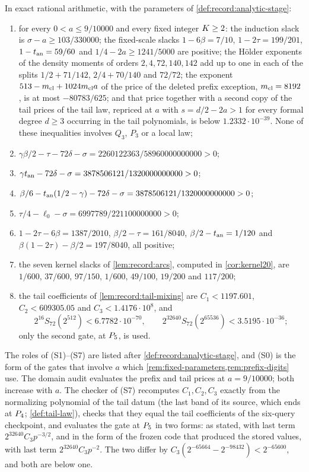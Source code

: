 \begin{certificate}\label{cert:record:analytic-stage}
In exact rational arithmetic, with the parameters of
\cref{def:record:analytic-stage}:
\begin{enumerate}[label=(S\arabic*),start=0]
\item for every $0<a\le9/10000$ and every fixed integer $K\ge2$: the
 induction slack is $\sigma-a\ge103/330000$; the fixed-scale slacks
 $1-6\beta=7/10$, $1-2\tau=199/201$, $1-t_{\rm an}=59/60$ and
 $1/4-2a\ge1241/5000$ are positive; the H\"older exponents of the density
 moments of orders $2,4,72,140,142$ add up to one in each of the splits
 $1/2+71/142$, $2/4+70/140$ and $72/72$; the exponent $513-m_{\mathrm{cl}}+1024m_{\mathrm{cl}} a$ of the
 price of the deleted prefix exception, $m_{\mathrm{cl}}=8192$, is at most $-80783/625$;
 and that price together with a second copy of the tail prices
 of the tail law, repriced at $a$ with $s=d/2-2a>1$ for every
 formal degree $d\ge3$ occurring in the tail polynomials, is
 below $1.2332\cdot10^{-39}$.
 None of these inequalities involves $Q_3$, $P_3$ or a local law;
\item $\gamma\beta/2-\tau-72\delta-\sigma=2260122363/58960000000000>0$;
\item $\gamma t_{\rm an}-72\delta-\sigma=3878506121/1320000000000>0$;
\item $\beta/6-t_{\rm an}(1/2-\gamma)-72\delta-\sigma=3878506121/1320000000000>0$;
\item $\tau/4-\ell_0-\sigma=6997789/221100000000>0$;
\item $1-2\tau-6\beta=1387/2010$, $\beta/2-\tau=161/8040$,
 $\beta/2-t_{\rm an}=1/120$ and $\beta(1-2\tau)-\beta/2=197/8040$, all
 positive;
\item the seven kernel slacks of \cref{lem:record:arcs}, computed in
 \cref{cor:kernel20}, are
 $1/600$, $37/600$, $97/150$, $1/600$, $49/100$, $19/200$ and $117/200$;
\item the tail coefficients of \cref{lem:record:tail-mixing} are
 $C_1<1197.601$, $C_2<609305.05$ and $C_3<1.4176\cdot10^8$, and
 \[
  2^{16}S_{72}(2^{512})<6.7782\cdot10^{-70},\qquad
  2^{32640}S_{72}(2^{65536})<3.5195\cdot10^{-36};
 \]
 only the second gate, at $P_5$, is used.
\end{enumerate}
\end{certificate}

The roles of (S1)--(S7) are listed after \cref{def:record:analytic-stage}, and
(S0) is the form of the gates that involve $a$ which
\cref{rem:fixed-parameters,rem:prefix-digits} use. The domain audit
evaluates the prefix and tail prices at $a=9/10000$; both increase with $a$.
The checker of (S7) recomputes $C_1,C_2,C_3$ exactly from the normalizing
polynomial of the tail datum (the last band of its source, which ends at
$P_4$; \cref{def:tail-law}), checks that they equal the tail coefficients of
the six-query checkpoint, and evaluates the gate at $P_5$ in two forms: as
stated, with last term $2^{32640}C_3p^{-3/2}$, and in the form of the frozen
code that produced the stored values, with last term $2^{32640}C_3p^{-2}$. The
two differ by $C_3(2^{-65664}-2^{-98432})<2^{-65600}$, and both are below one.

